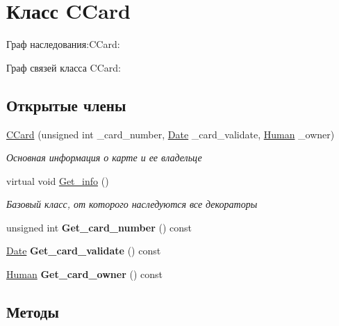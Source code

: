 \hypertarget{classCCard}{}\section{Класс C\+Card}
\label{classCCard}


Граф наследования\+:C\+Card\+:


Граф связей класса C\+Card\+:
\subsection*{Открытые члены}
\begin{DoxyCompactItemize}
\item 
\hyperlink{classCCard_aaead4314535e2c8eb5ac2aac6e0de2ed}{C\+Card} (unsigned int \+\_\+card\+\_\+number, \hyperlink{structDate}{Date} \+\_\+card\+\_\+validate, \hyperlink{structHuman}{Human} \+\_\+owner)\hypertarget{classCCard_aaead4314535e2c8eb5ac2aac6e0de2ed}{}\label{classCCard_aaead4314535e2c8eb5ac2aac6e0de2ed}

\begin{DoxyCompactList}\small\item\em Основная информация о карте и ее владельце \end{DoxyCompactList}\item 
virtual void \hyperlink{classCCard_af4e149a1fb6fe5f1c545d973be96af21}{Get\+\_\+info} ()
\begin{DoxyCompactList}\small\item\em Базовый класс, от которого наследуются все декораторы \end{DoxyCompactList}\item 
unsigned int {\bfseries Get\+\_\+card\+\_\+number} () const \hypertarget{classCCard_a2fd099c4129ffbd77f2a0450ede3c761}{}\label{classCCard_a2fd099c4129ffbd77f2a0450ede3c761}

\item 
\hyperlink{structDate}{Date} {\bfseries Get\+\_\+card\+\_\+validate} () const \hypertarget{classCCard_a0054e392e1226b3f3cfbd623a5fd1dab}{}\label{classCCard_a0054e392e1226b3f3cfbd623a5fd1dab}

\item 
\hyperlink{structHuman}{Human} {\bfseries Get\+\_\+card\+\_\+owner} () const \hypertarget{classCCard_a7636abe12ac30fc4c794b59d507f38aa}{}\label{classCCard_a7636abe12ac30fc4c794b59d507f38aa}

\end{DoxyCompactItemize}


\subsection{Методы}
